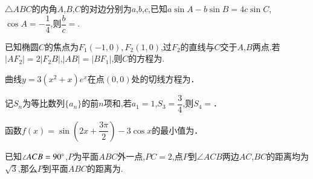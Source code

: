 \documentclass[a4paper]{BHCexam}
\begin{document}
\begin{groups}
\begin{questions}[]
\begin{minipage}{\textwidth}
\begin{solution}{4cm}
\end{solution}
\end{minipage}
\begin{minipage}{\textwidth}
\question[5] $\triangle ABC$的内角$A$,$B$,$C$的对边分别为$a$,$b$,$c$,已知$a\sin A-b\sin B=4c\sin C$,$\cos A=- \dfrac {1}{4}$,则$ \dfrac {b}{c} =$.
\begin{solution}{4cm}

\end{solution}
\end{minipage}
\begin{minipage}{\textwidth}
\question[5] 已知椭圆$C$的焦点为${F}_{1}( - 1,0),{F}_{2}(1,0)$,过$F _{2}$的直线与$C$交于$A$,$B$两点$.$若$|A{F}_{2}|=2|{F}_{2}B|$,$|AB|=|B{F}_{1}|$,则$C$的方程为.
\begin{solution}{4cm}

\end{solution}
\end{minipage}
\end{questions}
\begin{questions}[]
\begin{minipage}{\textwidth}
\question[5]  曲线$y=3(x ^{2} +x)e ^{x}$在点$(0 , 0)$处的切线方程为．
\begin{solution}{4cm}

\end{solution}
\end{minipage}
\begin{minipage}{\textwidth}
\question[5]  记$S _{n}$为等比数列$\{a _{n} \}$的前$n$项和,若$a _{1} =1$,$S _{3} = \dfrac{3}{4}$,则$S _{4} =$．
\begin{solution}{4cm}

\end{solution}
\end{minipage}
\begin{minipage}{\textwidth}
\question[5]  函数$f(x)=\sin(2x+ \dfrac{3\pi}{2} )-3\cos x$的最小值为．
\begin{solution}{4cm}

\end{solution}
\end{minipage}
\begin{minipage}{\textwidth}
\question[5] 已知$ \angle ACB=90^{\small \circ}$,$P$为平面$ABC$外一点,$PC=2$,点$P$到$ \angle ACB$两边$AC$,$BC$的距离均为$\sqrt{3}$,那么$P$到平面$ABC$的距离为.
\begin{solution}{4cm}


\end{solution}
\end{minipage}
\end{questions}
\end{groups}
\end{document}
